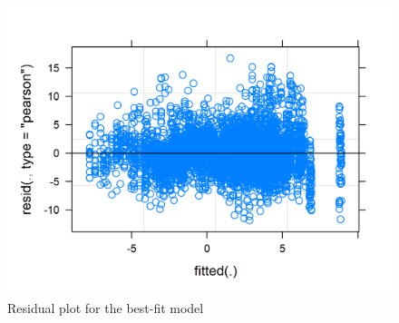 \begin{figure}[H]
\centering       
    \includegraphics{Images/residual-best-fit.png}
    \caption{Residual plot for the best-fit model}
    \label{fig:lme-residual}
\end{figure}